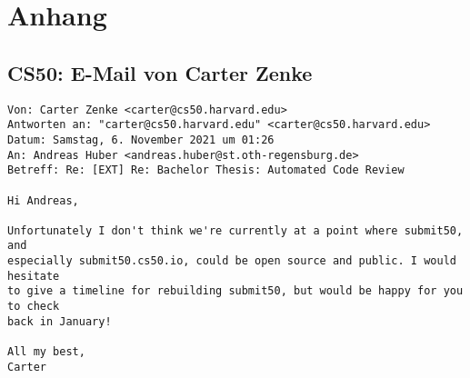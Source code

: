 \appendix
\section*{Anhang}
\renewcommand{\thesubsection}{\Alph{subsection}}

\subsection{CS50: E-Mail von Carter Zenke}\label{appendix:carter-zenke}
\begin{lstlisting}[style=Bash]
Von: Carter Zenke <carter@cs50.harvard.edu>
Antworten an: "carter@cs50.harvard.edu" <carter@cs50.harvard.edu>
Datum: Samstag, 6. November 2021 um 01:26
An: Andreas Huber <andreas.huber@st.oth-regensburg.de>
Betreff: Re: [EXT] Re: Bachelor Thesis: Automated Code Review
 
Hi Andreas,
 
Unfortunately I don't think we're currently at a point where submit50, and
especially submit50.cs50.io, could be open source and public. I would hesitate
to give a timeline for rebuilding submit50, but would be happy for you to check
back in January!
 
All my best,
Carter
\end{lstlisting}

\newpage




 

\newpage



 